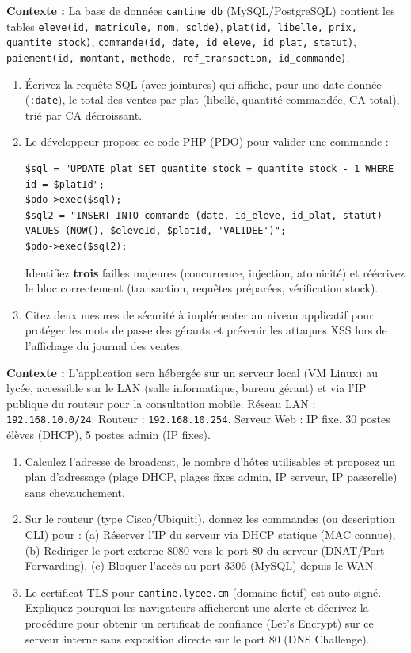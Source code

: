 \documentclass[11pt]{article}
\begin{document}
\begin{exercice}
\textbf{Contexte :} La base de données \texttt{cantine\_db} (MySQL/PostgreSQL) contient les tables \texttt{eleve(id, matricule, nom, solde)}, \texttt{plat(id, libelle, prix, quantite\_stock)}, \texttt{commande(id, date, id\_eleve, id\_plat, statut)}, \texttt{paiement(id, montant, methode, ref\_transaction, id\_commande)}.
\begin{enumerate}
    \item Écrivez la requête SQL (avec jointures) qui affiche, pour une date donnée (\texttt{:date}), le total des ventes par plat (libellé, quantité commandée, CA total), trié par CA décroissant.
    \item Le développeur propose ce code PHP (PDO) pour valider une commande :
\begin{verbatim}
$sql = "UPDATE plat SET quantite_stock = quantite_stock - 1 WHERE id = $platId";
$pdo->exec($sql);
$sql2 = "INSERT INTO commande (date, id_eleve, id_plat, statut) VALUES (NOW(), $eleveId, $platId, 'VALIDEE')";
$pdo->exec($sql2);
\end{verbatim}
    Identifiez \textbf{trois} failles majeures (concurrence, injection, atomicité) et réécrivez le bloc correctement (transaction, requêtes préparées, vérification stock).
    \item Citez deux mesures de sécurité à implémenter au niveau applicatif pour protéger les mots de passe des gérants et prévenir les attaques XSS lors de l'affichage du journal des ventes.
\end{enumerate}
\end{exercice}

\begin{exercice}
\textbf{Contexte :} L'application sera hébergée sur un serveur local (VM Linux) au lycée, accessible sur le LAN (salle informatique, bureau gérant) et via l'IP publique du routeur pour la consultation mobile. Réseau LAN : \texttt{192.168.10.0/24}. Routeur : \texttt{192.168.10.254}. Serveur Web : IP fixe. 30 postes élèves (DHCP), 5 postes admin (IP fixes).
\begin{enumerate}
    \item Calculez l'adresse de broadcast, le nombre d'hôtes utilisables et proposez un plan d'adressage (plage DHCP, plages fixes admin, IP serveur, IP passerelle) sans chevauchement.
    \item Sur le routeur (type Cisco/Ubiquiti), donnez les commandes (ou description CLI) pour : (a) Réserver l'IP du serveur via DHCP statique (MAC connue), (b) Rediriger le port externe 8080 vers le port 80 du serveur (DNAT/Port Forwarding), (c) Bloquer l'accès au port 3306 (MySQL) depuis le WAN.
    \item Le certificat TLS pour \texttt{cantine.lycee.cm} (domaine fictif) est auto-signé. Expliquez pourquoi les navigateurs afficheront une alerte et décrivez la procédure pour obtenir un certificat de confiance (Let's Encrypt) sur ce serveur interne sans exposition directe sur le port 80 (DNS Challenge).
\end{enumerate}
\end{exercice}
\end{document}
